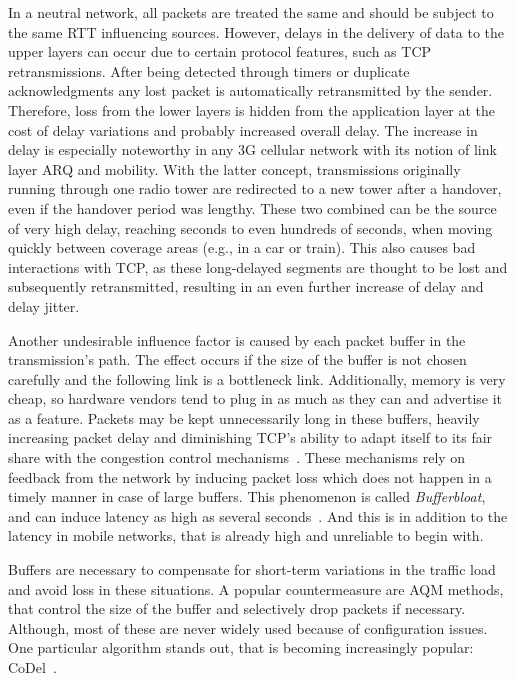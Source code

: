 In a neutral network, all packets are treated the same and should be subject to the same \gls{RTT} influencing sources.
However, delays in the delivery of data to the upper layers can occur due to certain protocol features, such as \gls{TCP} retransmissions. After being detected through timers or duplicate acknowledgments any lost packet is automatically retransmitted by the sender. Therefore, loss from the lower layers is hidden from the application layer at the cost of delay variations and probably increased overall delay. The increase in delay is especially noteworthy in any \gls{3G} cellular network with its notion of link layer \gls{ARQ} and mobility. With the latter concept, transmissions originally running through one radio tower are redirected to a new tower after a handover, even if the handover period was lengthy. These two combined can be the source of very high delay, reaching seconds to even hundreds of seconds, when moving quickly between coverage areas (e.g., in a car or train). 
This also causes bad interactions with \gls{TCP}, as these long-delayed segments are thought to be lost and subsequently retransmitted, resulting in an even further increase of delay and delay jitter.

Another undesirable influence factor is caused by each packet buffer in the transmission's path. The effect occurs if the size of the buffer is not chosen carefully and the following link is a bottleneck link. Additionally, memory is very cheap, so hardware vendors tend to plug in as much as they can and advertise it as a feature. Packets may be kept unnecessarily long in these buffers, heavily increasing packet delay and diminishing \gls{TCP}'s ability to adapt itself to its fair share with the congestion control mechanisms~\cite{jacobson1988congestion,scharf2011comparison}. These mechanisms rely on feedback from the network by inducing packet loss which does not happen in a timely manner in case of large buffers. This phenomenon is called \textit{Bufferbloat}, and can induce latency as high as several seconds~\cite{gettys2011bufferbloat,groenewegen2011detecting}. And this is in addition to the latency in mobile networks, that is already high and unreliable to begin with.

Buffers are necessary to compensate for short-term variations in the traffic load and avoid loss in these situations. A popular countermeasure are \gls{AQM} methods, that control the size of the buffer and selectively drop packets if necessary. Although, most of these are never widely used because of configuration issues. One particular algorithm stands out, that is becoming increasingly popular: CoDel~\cite{Nichols:2012:CQD:2209249.2209264, nichols2014codel}.

